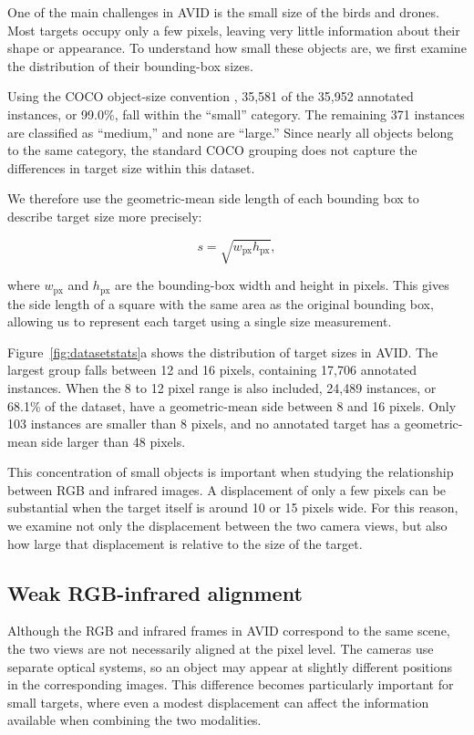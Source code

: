 \documentclass[10pt]{article}
\newcommand{\dataset}{\textsc{AVID}}
\begin{document}
One of the main challenges in \dataset{} is the small size of the birds and drones. Most targets occupy only a few pixels, leaving very little information about their shape or appearance. To understand how small these objects are, we first examine the distribution of their bounding-box sizes.

Using the COCO object-size convention \citep{lin2014coco}, 35,581 of the 35,952 annotated instances, or 99.0\%, fall within the ``small'' category. The remaining 371 instances are classified as ``medium,'' and none are ``large.'' Since nearly all objects belong to the same category, the standard COCO grouping does not capture the differences in target size within this dataset.

We therefore use the geometric-mean side length of each bounding box to describe target size more precisely:

\begin{equation}
s=\sqrt{w_{\mathrm{px}}h_{\mathrm{px}}},
\end{equation}

where $w_{\mathrm{px}}$ and $h_{\mathrm{px}}$ are the bounding-box width and height in pixels. This gives the side length of a square with the same area as the original bounding box, allowing us to represent each target using a single size measurement.

Figure~\ref{fig:datasetstats}a shows the distribution of target sizes in \dataset{}. The largest group falls between 12 and 16 pixels, containing 17,706 annotated instances. When the 8 to 12 pixel range is also included, 24,489 instances, or 68.1\% of the dataset, have a geometric-mean side between 8 and 16 pixels. Only 103 instances are smaller than 8 pixels, and no annotated target has a geometric-mean side larger than 48 pixels.

This concentration of small objects is important when studying the relationship between RGB and infrared images. A displacement of only a few pixels can be substantial when the target itself is around 10 or 15 pixels wide. For this reason, we examine not only the displacement between the two camera views, but also how large that displacement is relative to the size of the target.

\subsection{Weak RGB-infrared alignment}
\label{sec:alignment}

Although the RGB and infrared frames in \dataset{} correspond to the same scene, the two views are not necessarily aligned at the pixel level. The cameras use separate optical systems, so an object may appear at slightly different positions in the corresponding images. This difference becomes particularly important for small targets, where even a modest displacement can affect the information available when combining the two modalities.
\end{document}
